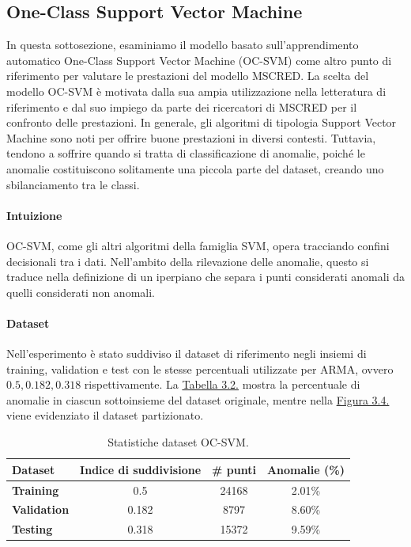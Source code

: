 \subsection{One-Class Support Vector Machine}
    In questa sottosezione, esaminiamo il modello basato sull'apprendimento automatico One-Class Support Vector 
    Machine\cite{ocsvm} (OC-SVM) come altro punto di riferimento per valutare le prestazioni del modello 
    MSCRED\cite{mscred}. La scelta del modello OC-SVM è motivata dalla sua ampia utilizzazione nella 
    letteratura di riferimento e dal suo impiego da parte dei ricercatori di MSCRED per il confronto delle 
    prestazioni. In generale, gli algoritmi di tipologia Support Vector Machine sono noti per offrire buone 
    prestazioni in diversi contesti. Tuttavia, tendono a soffrire quando si tratta di classificazione di 
    anomalie, poiché le anomalie costituiscono solitamente una piccola parte del dataset, creando uno 
    sbilanciamento tra le classi.

    \paragraph{Intuizione} OC-SVM, come gli altri algoritmi della famiglia SVM, opera tracciando confini 
    decisionali tra i dati. Nell'ambito della rilevazione delle anomalie, questo si traduce nella definizione 
    di un iperpiano che separa i punti considerati anomali da quelli considerati non anomali.

    \paragraph{Dataset} Nell'esperimento è stato suddiviso il dataset di riferimento negli insiemi di training, 
    validation e test con le stesse percentuali utilizzate per ARMA, ovvero $0.5, 0.182, 0.318$ rispettivamente. 
    La \hyperref[tab:dataset-ocsvm]{Tabella 3.2.} mostra la percentuale di anomalie in ciascun 
    sottoinsieme del dataset originale, mentre nella \hyperref[fig:dataset-div1]{Figura 3.4.} viene
    evidenziato il dataset partizionato.


    \begin{table}[H]
        \centering
        \caption{Statistiche dataset OC-SVM.}
        \begin{tabular}{lccc}
            \toprule
            \textbf{Dataset} & \textbf{Indice di suddivisione} & \textbf{\# punti} & \textbf{Anomalie (\%)} \\
            \toprule
            \textbf{Training}   & 0.5   &  24168 & 2.01\% \\
            \textbf{Validation} & 0.182 &  8797  & 8.60\% \\
            \textbf{Testing}    & 0.318 &  15372 & 9.59\% \\
            \bottomrule
        \end{tabular}
        \label{tab:dataset-ocsvm}
    \end{table}

